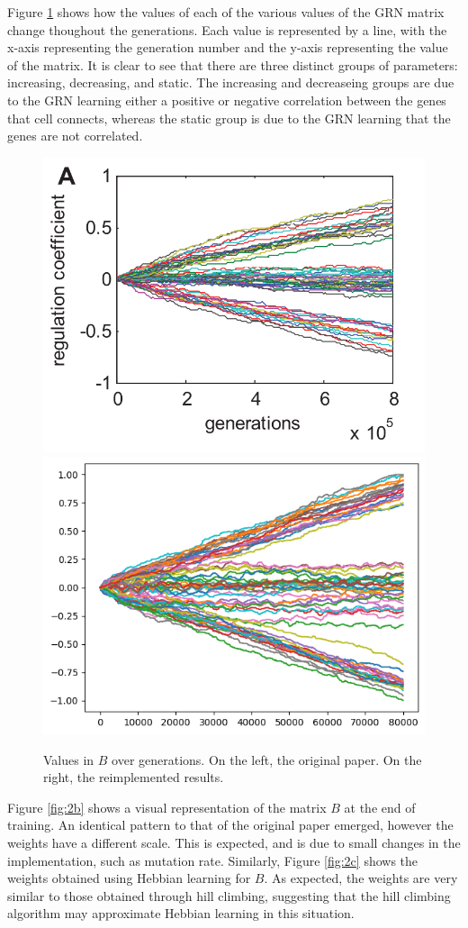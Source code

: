 \documentclass[twocolumn,a4paper]{article}
\begin{document}
    Figure \ref{fig:2a} shows how the values of each of the various values of the GRN matrix change thoughout the generations. Each value is represented by a line, with the x-axis representing the generation number and the y-axis representing the value of the matrix. It is clear to see that there are three distinct groups of parameters: increasing, decreasing, and static. The increasing and decreaseing groups are due to the GRN learning either a positive or negative correlation between the genes that cell connects, whereas the static group is due to the GRN learning that the genes are not correlated.
    \begin{figure}[h]
        \centering
        \includegraphics[width=0.48\linewidth]{orig_img/fig2a.png}
        \includegraphics[width=0.48\linewidth]{img/fig2a.png}
        \caption{Values in $B$ over generations. On the left, the original paper. On the right, the reimplemented results.} \label{fig:2a}
    \end{figure}

    Figure \ref{fig:2b} shows a visual representation of the matrix $B$ at the end of training. An identical pattern to that of the original paper emerged, however the weights have a different scale. This is expected, and is due to small changes in the implementation, such as mutation rate. Similarly, Figure \ref{fig:2c} shows the weights obtained using Hebbian learning for $B$. As expected, the weights are very similar to those obtained through hill climbing, suggesting that the hill climbing algorithm may approximate Hebbian learning in this situation.
\end{document}
